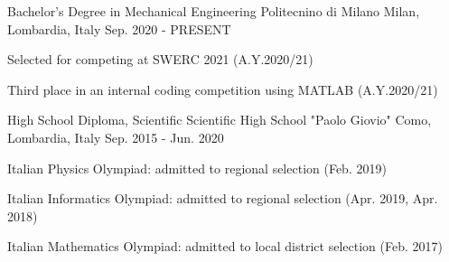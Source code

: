 

\begin{cventries}

  \cventry
  {Bachelor's Degree in Mechanical Engineering} %
  {Politecnino di Milano} %
  {Milan, Lombardia, Italy} %
  {Sep. 2020 - PRESENT} %
  {
    \begin{cvitems} %
      \item {Selected for competing at SWERC 2021 (A.Y.2020/21)}
      \item {Third place in an internal coding competition using MATLAB (A.Y.2020/21)}
    \end{cvitems}
  }


  \cventry
  {High School Diploma, Scientific} %
  {Scientific High School "Paolo Giovio"} %
  {Como, Lombardia, Italy} %
  {Sep. 2015 - Jun. 2020} %
  {
    \begin{cvitems} %
      \item {Italian Physics Olympiad: admitted to regional selection (Feb. 2019)}
      \item {Italian Informatics Olympiad: admitted to regional selection (Apr. 2019, Apr. 2018)}
      \item {Italian Mathematics Olympiad: admitted to local district selection (Feb. 2017)}
    \end{cvitems}
  }

\end{cventries}
